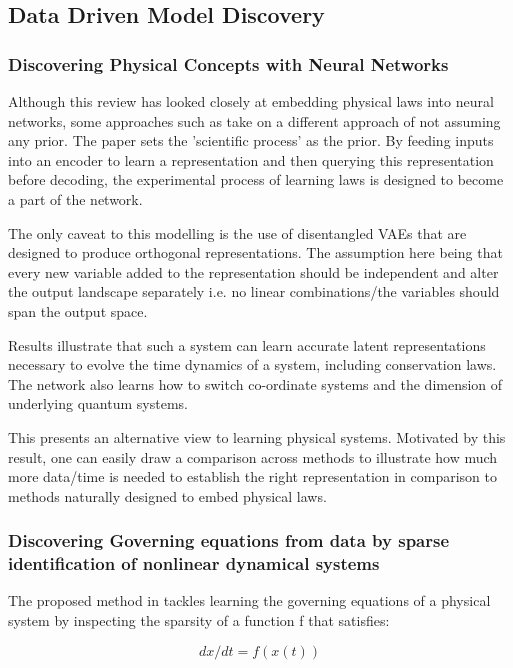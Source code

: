 \documentclass{article}
\begin{document}
\subsection{Data Driven Model Discovery}

\subsubsection{Discovering Physical Concepts with Neural Networks}

Although this review has looked closely at embedding physical laws into neural networks, some approaches such as \cite{iten_discovering_2020} take on a different approach of not assuming any prior. The paper sets the 'scientific process' as the prior. 
By feeding inputs into an encoder to learn a representation and then querying this representation before decoding, the experimental process of learning laws is designed to become a part of the network.

The only caveat to this modelling is the use of disentangled VAEs that are designed to produce orthogonal representations. The assumption here being that every new variable added to the representation should be independent and alter the output landscape separately i.e. no linear combinations/the variables should span the output space.

Results illustrate that such a system can learn accurate latent representations necessary to evolve the time dynamics of a system, including conservation laws. The network also learns how to switch co-ordinate systems and the dimension of underlying quantum systems. 

This presents an alternative view to learning physical systems. Motivated by this result, one can easily draw a comparison across methods to illustrate how much more data/time is needed to establish the right representation in comparison to methods naturally designed to embed physical laws. 

\subsubsection{Discovering Governing equations from data by sparse identification of nonlinear dynamical systems}

 The proposed method in \cite{brunton_discovering_2016} tackles learning the governing equations of a physical system by inspecting the sparsity of a function f that satisfies:
 
 $$ d x/dt = f(x(t)) $$
 
\end{document}
